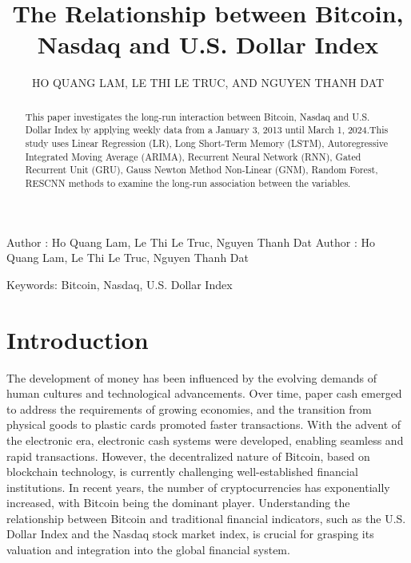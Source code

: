 \documentclass{ieeeojies}
\begin{document}
\title{The Relationship between Bitcoin, Nasdaq and U.S. Dollar Index}

\author{\uppercase{Ho Quang Lam},
\uppercase{Le Thi Le Truc, and Nguyen Thanh Dat}}

\address[1]{Faculty of Information Systems, University of Information Technology, (e-mail: 21521049@gm.uit.edu.vn)}
\address[2]{Faculty of Information Systems, University of Information Technology, (e-mail: 21521586@gm.uit.edu.vn)}
\address[3]{Faculty of Information Systems, University of Information Technology, (e-mail: 21521938@gm.uit.edu.vn)}

\markboth
{Author \headeretal: Ho Quang Lam, Le Thi Le Truc, Nguyen Thanh Dat}
{Author \headeretal: Ho Quang Lam, Le Thi Le Truc, Nguyen Thanh Dat}

\begin{abstract}
This paper investigates the long-run interaction between Bitcoin, Nasdaq and U.S. Dollar Index by applying weekly data from a
January 3, 2013 until March 1, 2024.This study uses  Linear Regression (LR), Long Short-Term Memory (LSTM), Autoregressive Integrated Moving Average (ARIMA), Recurrent Neural Network (RNN), Gated Recurrent Unit (GRU), Gauss Newton Method Non-Linear (GNM), Random Forest, RESCNN methods to examine the long-run association between the variables.
\end{abstract}

\begin{keywords}
Keywords: Bitcoin, Nasdaq, U.S. Dollar Index
\end{keywords}

\titlepgskip=-15pt

\maketitle

\section{Introduction}
\label{sec:introduction}
The development of money has been influenced by the evolving demands of human cultures and technological advancements. Over time, paper cash emerged to address the requirements of growing economies, and the transition from physical goods to plastic cards promoted faster transactions. With the advent of the electronic era, electronic cash systems were developed, enabling seamless and rapid transactions. However, the decentralized nature of Bitcoin, based on blockchain technology, is currently challenging well-established financial institutions. In recent years, the number of cryptocurrencies has exponentially increased, with Bitcoin being the dominant player. Understanding the relationship between Bitcoin and traditional financial indicators, such as the U.S. Dollar Index and the Nasdaq stock market index, is crucial for grasping its valuation and integration into the global financial system.
\end{document}
